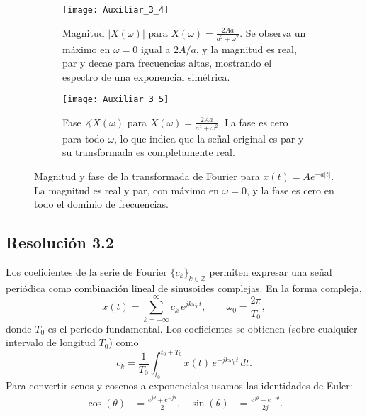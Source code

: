 \documentclass[
  11pt,
  letterpaper,
   addpoints,
   answers
  ]{exam}
\begin{document}
\begin{questions}
\begin{solution}
\begin{figure}[H]
  \begin{subfigure}[t]{0.48\textwidth}
    \centering
    \texttt{[image: Auxiliar\_3\_4]} %
    \caption{Magnitud $|X(\omega)|$ para $X(\omega)=\frac{2Aa}{a^2+\omega^2}$. Se observa un máximo en $\omega=0$ igual a $2A/a$, y la magnitud es real, par y decae para frecuencias altas, mostrando el espectro de una exponencial simétrica.}
    \label{fig:mag_XF2}
  \end{subfigure}
  \hfill
  \begin{subfigure}[t]{0.48\textwidth}
    \centering
    \texttt{[image: Auxiliar\_3\_5]}
    \caption{Fase $\measuredangle X(\omega)$ para $X(\omega)=\frac{2Aa}{a^2+\omega^2}$. La fase es cero para todo $\omega$, lo que indica que la señal original es par y su transformada es completamente real.}
    \label{fig:fase_XF2}
  \end{subfigure}

  \caption{Magnitud y fase de la transformada de Fourier para $x(t)=A e^{-a|t|}$. La magnitud es real y par, con máximo en $\omega=0$, y la fase es cero en todo el dominio de frecuencias.}
  \label{fig:mag_fase_XF2}
\end{figure}

\subsection*{Resolución 3.2}
Los coeficientes de la serie de Fourier \( \{c_k\}_{k\in\mathbb{Z}} \) permiten expresar una señal periódica como combinación lineal de sinusoides complejas. En la forma compleja,
\begin{equation}
x(t)=\sum_{k=-\infty}^{\infty} c_k\,e^{jk\omega_0 t}, 
\qquad \omega_0=\frac{2\pi}{T_0},
\end{equation}
donde \(T_0\) es el período fundamental. Los coeficientes se obtienen (sobre cualquier intervalo de longitud \(T_0\)) como
\begin{equation}
c_k=\frac{1}{T_0}\int_{t_0}^{t_0+T_0} x(t)\,e^{-jk\omega_0 t}\,dt .
\end{equation}
Para convertir senos y cosenos a exponenciales usamos las identidades de Euler:
\begin{align}
\cos(\theta) &= \frac{e^{j\theta}+e^{-j\theta}}{2}, &
\sin(\theta) &= \frac{e^{j\theta}-e^{-j\theta}}{2j}.
\end{align}


\end{solution}
\end{questions}
\end{document}
